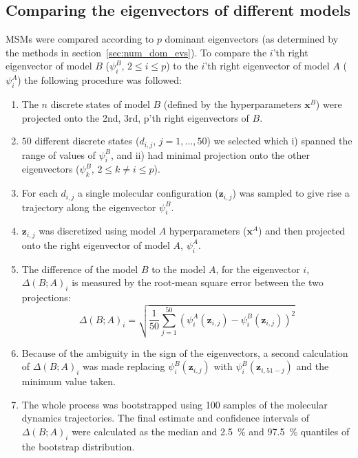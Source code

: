 \documentclass[journal=jacsat,manuscript=article]{achemso}
\begin{document}
 \subsection{Comparing the eigenvectors of different models}
 
MSMs were compared according to $p$ dominant eigenvectors (as determined by the methods in section~\ref{sec:num_dom_evs}). To compare the $i$'th right eigenvector of model $B$ ($\psi^{B}_{i}$, $2 \le i \le p$) to the $i$'th right eigenvector of model $A$ ($\psi^{A}_{i}$) the following procedure was followed: 

\begin{enumerate}
    \item The $n$ discrete states of model $B$  (defined by the hyperparameters $\mathbf{x}^{B}$) were projected onto the 2nd, 3rd, p'th right eigenvectors of $B$. \label{molpx_project}   
    \item $50$ different discrete states ($d_{i,j}$, $j = 1,\ldots, 50$) we selected which i) spanned the range of values of $\psi^{B}_{i}$, and ii) had minimal projection onto the other eigenvectors ($\psi^{B}_{k}$, $2 \le k \ne i \le p$). \label{molpx_sample}
    \item For each $d_{i,j}$ a single molecular configuration ($\mathbf{z}_{i, j}$) was sampled to give rise a trajectory along the eigenvector $\psi^{B}_{i}$. \label{molpx_configs}
    \item $\mathbf{z}_{i, j}$ was discretized using model $A$ hyperparameters ($\mathbf{x}^{A}$) and then projected onto the right eigenvector of model $A$, $\psi^{A}_{i}$. 
    \item The difference of the model $B$ to the model $A$, for the eigenvector $i$, $\Delta(B; A)_{i}$ is measured by the root-mean square error between the two projections:
    \begin{equation}
        \Delta(B; A)_{i} = \sqrt{\frac{1}{50}\sum_{j=1}^{50} \left(\psi^{A}_{i}(\mathbf{z}_{i, j})- \psi^{B}_{i}(\mathbf{z}_{i, j})\right )^{2}}
    \end{equation}\label{eqn:overlap}
    \item Because of the ambiguity in the sign of the eigenvectors, a second calculation of  $\Delta(B; A)_{i}$ was made replacing $\psi^{B}_{i}(\mathbf{z}_{i, j})$ with $\psi^{B}_{i}(\mathbf{z}_{i, 51-j})$ and the minimum value taken. 
    \item The whole process was bootstrapped using \num{100} samples of the molecular dynamics trajectories. The final estimate and confidence intervals of $\Delta(B; A)_{i}$ were calculated as the median and \SI{2.5}{\percent} and \SI{97.5}{\percent} quantiles of the bootstrap distribution. 
\end{enumerate}
\end{document}
